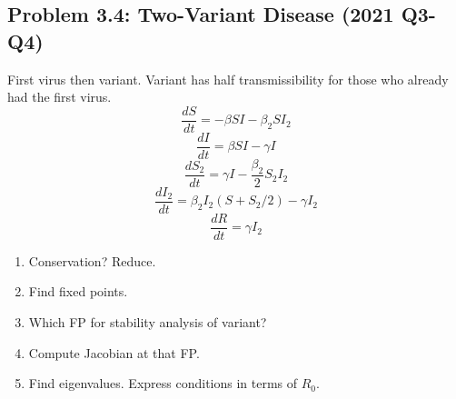 \documentclass[10pt]{article}
\begin{document}
\subsection{Problem 3.4: Two-Variant Disease (2021 Q3-Q4)}

\begin{problem}
First virus then variant. Variant has half transmissibility for those who already had the first virus.
\[
\frac{dS}{dt} = -\beta SI - \beta_2 S I_2
\]
\[
\frac{dI}{dt} = \beta SI - \gamma I
\]
\[
\frac{dS_2}{dt} = \gamma I - \frac{\beta_2}{2} S_2 I_2
\]
\[
\frac{dI_2}{dt} = \beta_2 I_2(S + S_2/2) - \gamma I_2
\]
\[
\frac{dR}{dt} = \gamma I_2
\]
\begin{enumerate}[label=(\alph*)]
\item Conservation? Reduce.
\item Find fixed points.
\item Which FP for stability analysis of variant?
\item Compute Jacobian at that FP.
\item Find eigenvalues. Express conditions in terms of $R_0$.
\end{enumerate}
\end{problem}
\end{document}
